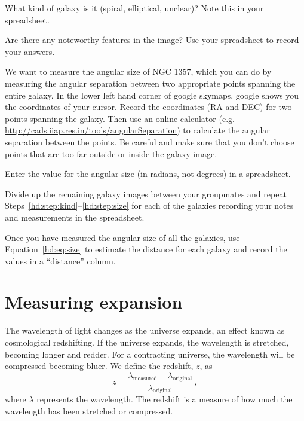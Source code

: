 \begin{steps}
	\item\label{hd:step:kind} What kind of galaxy is it (spiral, elliptical, unclear)? Note this in your spreadsheet.
	
	\item Are there any noteworthy features in the image? Use your spreadsheet to record your answers.
\end{steps}

We want to measure the angular size of NGC 1357, which you can do by
measuring the angular separation between two appropriate points
spanning the entire galaxy. In the lower left hand corner of google
skymaps, google shows you the coordinates of your cursor. Record the
coordinates (RA and DEC) for two points spanning the galaxy. Then use
an online calculator (e.g.
\url{http://cads.iiap.res.in/tools/angularSeparation}) to calculate the
angular separation between the points. Be careful and make sure that you don’t choose points that are too far
outside or inside the galaxy image.

\begin{steps}
	\item\label{hd:step:size} Enter the value for the angular size
(in radians, not degrees) in a spreadsheet.

	\item Divide up the remaining galaxy images between your groupmates
	and repeat Steps~\ref{hd:step:kind}--\ref{hd:step:size} for each of the galaxies recording your notes
	and measurements in the spreadsheet.
	
	\item Once you have measured the angular size of all the galaxies, use Equation~\ref{hd:eq:size} to estimate the distance for each galaxy
	and record the values in a “distance” column.
\end{steps}





\section{Measuring expansion}

The wavelength of light changes as the universe expands, an effect
known as cosmological redshifting. If the universe expands, the
wavelength is stretched, becoming longer and redder. For a contracting
universe, the wavelength will be compressed becoming bluer. We define
the redshift, $z$, as
\begin{equation}\label{hd:eq:redshift}
 z = \frac{\lambda_\textrm{measured} - \lambda_\textrm{original}}{\lambda_\textrm{original}} \,,
\end{equation}
where $\lambda$ represents the wavelength. The redshift is a measure of how much the wavelength has been
stretched or compressed.

